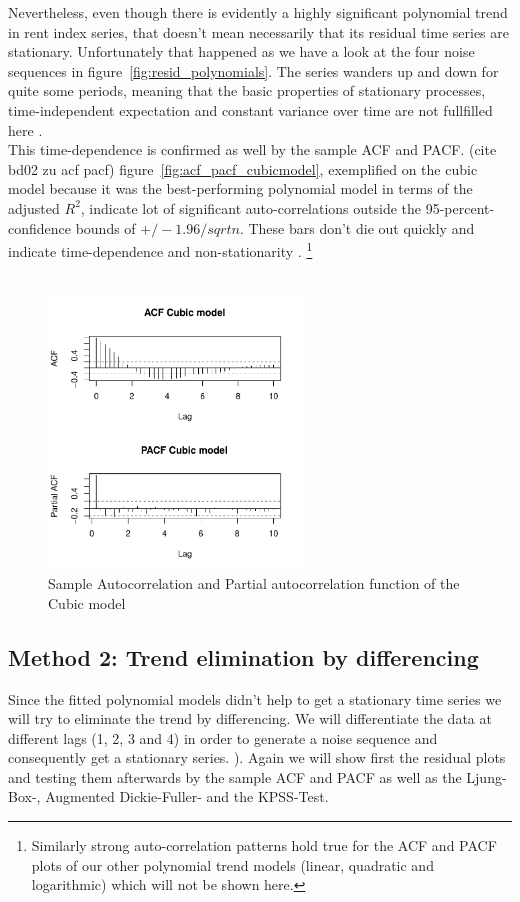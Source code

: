 \documentclass[11pt,a4paper]{article}
\begin{document}
Nevertheless, even though there is evidently a highly significant polynomial trend in rent index series, that doesn't mean necessarily that its residual time series are stationary. Unfortunately that happened as we have a look at the four noise sequences in figure~\ref{fig:resid_polynomials}. The series wanders up and down for quite some periods, meaning that the basic properties of stationary processes, time-independent expectation and constant variance over time are not fullfilled here \cite[p.~49]{bd02}. \\
This time-dependence is confirmed as well by the sample ACF and PACF. (cite bd02 zu acf pacf) figure~\ref{fig:acf_pacf_cubicmodel}, exemplified on the cubic model because it was the best-performing polynomial model  in terms of the adjusted $R^2$, indicate lot of significant auto-correlations outside the 95-percent-confidence bounds of $+/-1.96/sqrt{n}$.  These bars don't die out quickly and indicate time-dependence and non-stationarity \cite[p.~21]{bd02}. \footnote{Similarly strong auto-correlation patterns hold true for the ACF and PACF plots of our other polynomial trend models (linear, quadratic and logarithmic) which will not be shown here.}\\
\\
\begin{figure}[!htb]
\centering
\includegraphics[angle=0,
width=0.6\textwidth]{acf_pacf_cubicmodel}
\caption{Sample Autocorrelation and Partial autocorrelation function of the Cubic model
\label{fig:acf_cubicmodel}}
\end{figure}


\subsection{Method 2: Trend elimination by differencing}
Since the fitted polynomial models didn't help to get a stationary time series we will try to eliminate the trend by differencing. We will differentiate the data at different lags (1, 2, 3 and 4) in order to generate a noise sequence and consequently get a stationary series. \cite[p.~35]{bd02}). Again we will show first the residual plots and testing them afterwards by the sample ACF and PACF as well as the Ljung-Box-, Augmented Dickie-Fuller- and the KPSS-Test.
\end{document}
